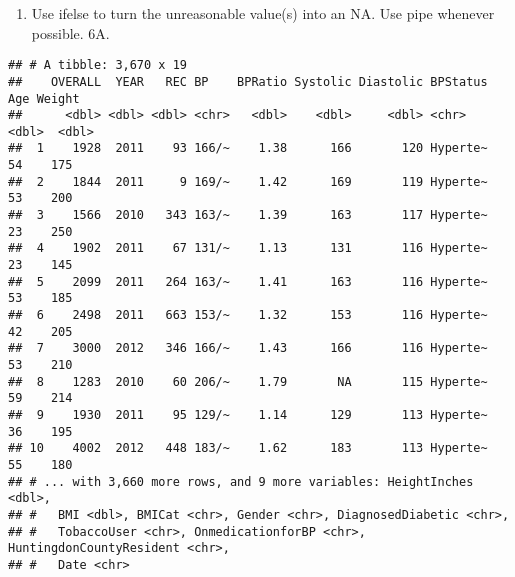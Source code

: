\documentclass[
]{article}
\newenvironment{Shaded}{\begin{snugshade}}{\end{snugshade}}
\newcommand{\CommentTok}[1]{\textcolor[rgb]{0.56,0.35,0.01}{\textit{#1}}}
\newcommand{\DataTypeTok}[1]{\textcolor[rgb]{0.13,0.29,0.53}{#1}}
\newcommand{\DecValTok}[1]{\textcolor[rgb]{0.00,0.00,0.81}{#1}}
\newcommand{\KeywordTok}[1]{\textcolor[rgb]{0.13,0.29,0.53}{\textbf{#1}}}
\newcommand{\NormalTok}[1]{#1}
\newcommand{\OperatorTok}[1]{\textcolor[rgb]{0.81,0.36,0.00}{\textbf{#1}}}
\newcommand{\OtherTok}[1]{\textcolor[rgb]{0.56,0.35,0.01}{#1}}
\newcommand{\StringTok}[1]{\textcolor[rgb]{0.31,0.60,0.02}{#1}}
\providecommand{\tightlist}{%
  \setlength{\itemsep}{0pt}\setlength{\parskip}{0pt}}
\begin{document}
\begin{enumerate}
\def\labelenumi{\arabic{enumi}.}
\setcounter{enumi}{5}
\tightlist
\item
  Use ifelse to turn the unreasonable value(s) into an NA. Use pipe
  whenever possible. 6A.
\end{enumerate}

\begin{Shaded}
\end{Shaded}

\begin{verbatim}
## # A tibble: 3,670 x 19
##    OVERALL  YEAR   REC BP    BPRatio Systolic Diastolic BPStatus   Age Weight
##      <dbl> <dbl> <dbl> <chr>   <dbl>    <dbl>     <dbl> <chr>    <dbl>  <dbl>
##  1    1928  2011    93 166/~    1.38      166       120 Hyperte~    54    175
##  2    1844  2011     9 169/~    1.42      169       119 Hyperte~    53    200
##  3    1566  2010   343 163/~    1.39      163       117 Hyperte~    23    250
##  4    1902  2011    67 131/~    1.13      131       116 Hyperte~    23    145
##  5    2099  2011   264 163/~    1.41      163       116 Hyperte~    53    185
##  6    2498  2011   663 153/~    1.32      153       116 Hyperte~    42    205
##  7    3000  2012   346 166/~    1.43      166       116 Hyperte~    53    210
##  8    1283  2010    60 206/~    1.79       NA       115 Hyperte~    59    214
##  9    1930  2011    95 129/~    1.14      129       113 Hyperte~    36    195
## 10    4002  2012   448 183/~    1.62      183       113 Hyperte~    55    180
## # ... with 3,660 more rows, and 9 more variables: HeightInches <dbl>,
## #   BMI <dbl>, BMICat <chr>, Gender <chr>, DiagnosedDiabetic <chr>,
## #   TobaccoUser <chr>, OnmedicationforBP <chr>, HuntingdonCountyResident <chr>,
## #   Date <chr>
\end{verbatim}
\end{document}
